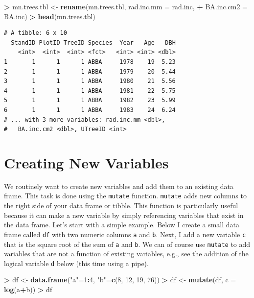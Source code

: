 \documentclass[]{krantz}
\makeatletter
\newenvironment{Shaded}{\begin{snugshade}}{\end{snugshade}}
\newcommand{\DataTypeTok}[1]{\textcolor[rgb]{0.27,0.27,0.27}{#1}}
\newcommand{\DecValTok}[1]{\textcolor[rgb]{0.06,0.06,0.06}{#1}}
\newcommand{\KeywordTok}[1]{\textcolor[rgb]{0.27,0.27,0.27}{\textbf{#1}}}
\newcommand{\NormalTok}[1]{#1}
\newcommand{\OperatorTok}[1]{\textcolor[rgb]{0.43,0.43,0.43}{\textbf{#1}}}
\newcommand{\StringTok}[1]{\textcolor[rgb]{0.5,0.5,0.5}{#1}}
\newenvironment{kframe}{%
\medskip{}
\setlength{\fboxsep}{.8em}
 \def\at@end@of@kframe{}%
 \ifinner\ifhmode%
  \def\at@end@of@kframe{\end{minipage}}%
  \begin{minipage}{\columnwidth}%
 \fi\fi%
 \def\FrameCommand##1{\hskip\@totalleftmargin \hskip-\fboxsep
 \colorbox{shadecolor}{##1}\hskip-\fboxsep
     \hskip-\linewidth \hskip-\@totalleftmargin \hskip\columnwidth}%
 \MakeFramed {\advance\hsize-\width
   \@totalleftmargin\z@ \linewidth\hsize
   \@setminipage}}%
 {\par\unskip\endMakeFramed%
 \at@end@of@kframe}
\renewenvironment{Shaded}{\begin{kframe}}{\end{kframe}}
\makeatother
\begin{document}
\begin{Shaded}
\begin{Highlighting}[]
\OperatorTok{>}\StringTok{ }\NormalTok{mn.trees.tbl <-}\StringTok{ }\KeywordTok{rename}\NormalTok{(mn.trees.tbl, }\DataTypeTok{rad.inc.mm =}\NormalTok{ rad.inc, }
\OperatorTok{+}\StringTok{                        }\DataTypeTok{BA.inc.cm2 =}\NormalTok{ BA.inc)}
\OperatorTok{>}\StringTok{ }\KeywordTok{head}\NormalTok{(mn.trees.tbl)}
\end{Highlighting}
\end{Shaded}

\begin{verbatim}
# A tibble: 6 x 10
  StandID PlotID TreeID Species  Year   Age   DBH
    <int>  <int>  <int> <fct>   <int> <int> <dbl>
1       1      1      1 ABBA     1978    19  5.23
2       1      1      1 ABBA     1979    20  5.44
3       1      1      1 ABBA     1980    21  5.56
4       1      1      1 ABBA     1981    22  5.75
5       1      1      1 ABBA     1982    23  5.99
6       1      1      1 ABBA     1983    24  6.24
# ... with 3 more variables: rad.inc.mm <dbl>,
#   BA.inc.cm2 <dbl>, UTreeID <int>
\end{verbatim}

\hypertarget{creating-new-variables}{%
\section{Creating New Variables}\label{creating-new-variables}}

We routinely want to create new variables and add them to an existing data frame. This task is done using the \texttt{mutate} function. \texttt{mutate} adds new columns to the right side of your data frame or tibble. This function is particularly useful because it can make a new variable by simply referencing variables that exist in the data frame. Let's start with a simple example. Below I create a small data frame called \texttt{df} with two numeric columns \texttt{a} and \texttt{b}. Next, I add a new variable \texttt{c} that is the square root of the sum of \texttt{a} and \texttt{b}. We can of course use \texttt{mutate} to add variables that are not a function of existing variables, e.g., see the addition of the logical variable \texttt{d} below (this time using a pipe).

\begin{Shaded}
\begin{Highlighting}[]
\OperatorTok{>}\StringTok{ }\NormalTok{df <-}\StringTok{ }\KeywordTok{data.frame}\NormalTok{(}\StringTok{"a"}\NormalTok{=}\DecValTok{1}\OperatorTok{:}\DecValTok{4}\NormalTok{, }\StringTok{"b"}\NormalTok{=}\KeywordTok{c}\NormalTok{(}\DecValTok{8}\NormalTok{, }\DecValTok{12}\NormalTok{, }\DecValTok{19}\NormalTok{, }\DecValTok{76}\NormalTok{))}
\OperatorTok{>}\StringTok{ }\NormalTok{df <-}\StringTok{ }\KeywordTok{mutate}\NormalTok{(df, }\DataTypeTok{c =} \KeywordTok{log}\NormalTok{(a}\OperatorTok{+}\NormalTok{b))}
\OperatorTok{>}\StringTok{ }\NormalTok{df}
\end{Highlighting}
\end{Shaded}
\end{document}
